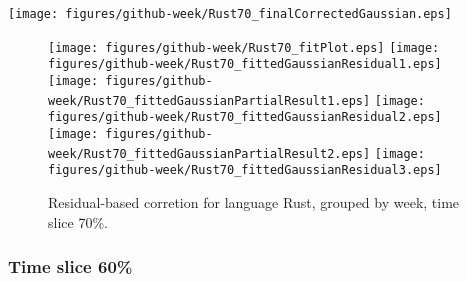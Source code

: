 \begin{center}
{\texttt{[image: figures/github-week/Rust70\_finalCorrectedGaussian.eps]}}
\end{center}

\FloatBarrier

\begin{figure}[t]
\centering
{}
{\texttt{[image: figures/github-week/Rust70\_fitPlot.eps]}}
{\texttt{[image: figures/github-week/Rust70\_fittedGaussianResidual1.eps]}}
{\texttt{[image: figures/github-week/Rust70\_fittedGaussianPartialResult1.eps]}}
{\texttt{[image: figures/github-week/Rust70\_fittedGaussianResidual2.eps]}}
{\texttt{[image: figures/github-week/Rust70\_fittedGaussianPartialResult2.eps]}}
{\texttt{[image: figures/github-week/Rust70\_fittedGaussianResidual3.eps]}}
\caption{Residual-based corretion for language Rust, grouped by week, time slice 70\%.}
\end{figure}


\FloatBarrier


\subsubsection{Time slice 60\%}

